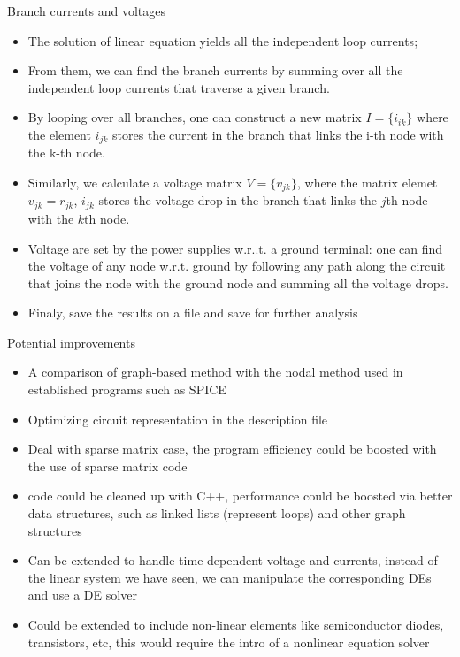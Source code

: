 \documentclass[xcolor=dvipsnames]{beamer}
\begin{document}
\begin{frame}[shrink=5]{Branch currents and voltages}
	\begin{itemize}
		\item The solution of linear equation yields all the independent loop currents;
		\item From them, we can find the branch currents by summing over all the independent loop currents that traverse a given branch.
		\item By looping over all branches, one can construct a new matrix $I=\{i_{ik}\}$ where the element $i_{jk}$ stores the current in the branch that links the i-th node with the k-th node.
		\item Similarly, we calculate a voltage matrix $V=\{v_{jk}\}$, where the matrix elemet $v_{jk} = r_{jk}$, $i_{jk}$ stores the voltage drop in the branch that links the $j$th node with the $k$th node.
		\item Voltage are set by the power supplies w.r..t. a ground terminal: one can find the voltage of any node w.r.t. ground by following any path along the circuit that joins the node with the ground node and summing all the voltage drops.
		\item Finaly, save the results on a file and save for further analysis
	\end{itemize}
\end{frame}

\begin{frame}{ Potential improvements}
	\begin{itemize}
		\item A comparison of graph-based method with the nodal method used in established programs such as SPICE
		\item Optimizing circuit representation in the description file
		\item Deal with sparse matrix case, the program efficiency could be boosted with the use of sparse matrix code
		\item code could be cleaned up with C++, performance could be boosted via better data structures, such as linked lists (represent loops) and other graph structures
		\item Can be extended to handle time-dependent voltage and currents, instead of the linear system we have seen, we can manipulate the corresponding DEs and use a DE solver
		\item Could be extended to include non-linear elements like semiconductor diodes, transistors, etc, this would require the intro of a nonlinear equation solver
	\end{itemize}
\end{frame}
\end{document}
